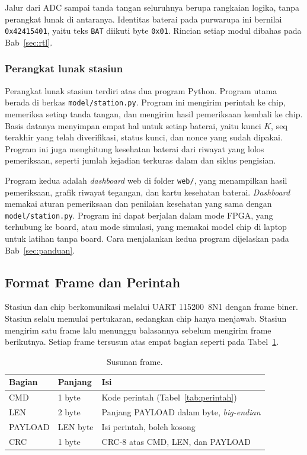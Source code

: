 \documentclass[11pt,a4paper]{article}
\begin{document}
Jalur dari ADC sampai tanda tangan seluruhnya berupa rangkaian logika, tanpa perangkat lunak di
antaranya. Identitas baterai pada purwarupa ini bernilai \texttt{0x42415401}, yaitu teks
\texttt{BAT} diikuti byte \texttt{0x01}. Rincian setiap modul dibahas pada Bab~\ref{sec:rtl}.

\subsubsection*{Perangkat lunak stasiun}

Perangkat lunak stasiun terdiri atas dua program Python. Program utama berada di berkas
\texttt{model/station.py}. Program ini mengirim perintah ke chip, memeriksa setiap tanda tangan,
dan mengirim hasil pemeriksaan kembali ke chip. Basis datanya menyimpan empat hal untuk setiap
baterai, yaitu kunci $K$, seq terakhir yang telah diverifikasi, status kunci, dan nonce yang
sudah dipakai. Program ini juga menghitung kesehatan baterai dari riwayat yang lolos
pemeriksaan, seperti jumlah kejadian terkuras dalam dan siklus pengisian.

Program kedua adalah \textit{dashboard} web di folder \texttt{web/}, yang menampilkan hasil
pemeriksaan, grafik riwayat tegangan, dan kartu kesehatan baterai. \textit{Dashboard} memakai
aturan pemeriksaan dan penilaian kesehatan yang sama dengan \texttt{model/station.py}. Program ini
dapat berjalan dalam mode FPGA, yang terhubung ke board, atau mode simulasi, yang memakai model
chip di laptop untuk latihan tanpa board. Cara menjalankan kedua program dijelaskan pada
Bab~\ref{sec:panduan}.

\subsection{Format Frame dan Perintah}

Stasiun dan chip berkomunikasi melalui UART 115200~8N1 dengan frame biner. Stasiun selalu memulai
pertukaran, sedangkan chip hanya menjawab. Stasiun mengirim satu frame lalu menunggu balasannya
sebelum mengirim frame berikutnya. Setiap frame tersusun atas empat bagian seperti pada
Tabel~\ref{tab:frame}.

\begin{table}[H]
  \centering
  \small
  \begin{tabularx}{\textwidth}{l l X}
    \toprule
    Bagian & Panjang & Isi \\
    \midrule
    CMD & 1 byte & Kode perintah (Tabel~\ref{tab:perintah}) \\
    LEN & 2 byte & Panjang PAYLOAD dalam byte, \textit{big-endian} \\
    PAYLOAD & LEN byte & Isi perintah, boleh kosong \\
    CRC & 1 byte & CRC-8 atas CMD, LEN, dan PAYLOAD \\
    \bottomrule
  \end{tabularx}
  \caption{Susunan frame.}
  \label{tab:frame}
\end{table}
\end{document}
